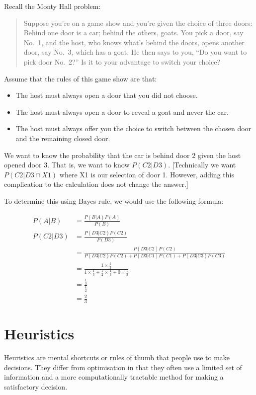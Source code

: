 \documentclass[
  letterpaper,
  DIV=11,
  numbers=noendperiod]{scrreprt}
\begin{document}
Recall the Monty Hall problem:

\begin{quote}
Suppose you're on a game show and you're given the choice of three
doors: Behind one door is a car; behind the others, goats. You pick a
door, say No.~1, and the host, who knows what's behind the doors, opens
another door, say No.~3, which has a goat. He then says to you, ``Do you
want to pick door No.~2?'' Is it to your advantage to switch your
choice?
\end{quote}

Assume that the rules of this game show are that:

\begin{itemize}
\item
  The host must always open a door that you did not choose.
\item
  The host must always open a door to reveal a goat and never the car.
\item
  The host must always offer you the choice to switch between the chosen
  door and the remaining closed door.
\end{itemize}

We want to know the probability that the car is behind door 2 given the
host opened door 3. That is, we want to know \(P(C2|D3)\).
{[}Technically we want \(P(C2|D3\cap X1)\) where X1 is our selection of
door 1. However, adding this complication to the calculation does not
change the answer.{]}

To determine this using Bayes rule, we would use the following formula:

\begin{align*}
P(A|B)&=\frac{P(B|A)P(A)}{P(B)} \\[12pt]
P(C2|D3)&=\frac{P(D3|C2)P(C2)}{P(D3)} \\[12pt]
&=\frac{P(D3|C2)P(C2)}{P(D3|C2)P(C2)+P(D3|C1)P(C1)+P(D3|C3)P(C3)} \\[12pt]
&=\frac{1\times\frac{1}{3}}{1\times\frac{1}{3}+\frac{1}{2}\times\frac{1}{3}+0\times\frac{1}{3}} \\[12pt]
&=\frac{\frac{1}{3}}{\frac{1}{2}} \\[12pt]
&=\frac{2}{3}
\end{align*}

\hypertarget{heuristics}{%
\chapter{Heuristics}\label{heuristics}}

Heuristics are mental shortcuts or rules of thumb that people use to
make decisions. They differ from optimisation in that they often use a
limited set of information and a more computationally tractable method
for making a satisfactory decision.
\end{document}
